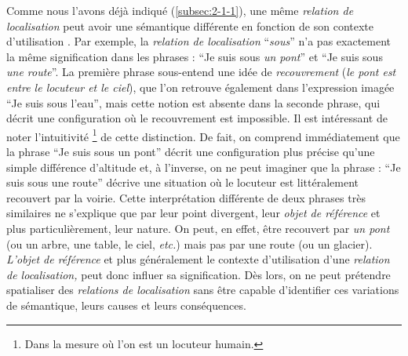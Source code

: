 Comme nous l'avons déjà indiqué (\autoref{subsec:2-1-1}), une même
\emph{relation de localisation} peut avoir une sémantique différente
en fonction de son contexte d'utilisation
\autocite[16]{Borillo1998}. Par exemple, la \emph{relation de
  localisation} \enquote{\emph{sous}} n'a pas exactement la même
signification dans les phrases : \enquote{Je suis sous \emph{un pont}}
et \enquote{Je suis sous \emph{une route}}. La première phrase
sous-entend une idée de \emph{recouvrement} (\ie \emph{le pont est
  entre le locuteur et le ciel}), que l'on retrouve également dans
l'expression imagée \enquote{Je suis sous l'eau}, mais cette notion
est absente dans la seconde phrase, qui décrit une configuration où le
recouvrement est impossible. Il est intéressant de noter l'intuitivité
\footnote{Dans la mesure où l'on est un locuteur humain.} de cette
distinction. De fait, on comprend immédiatement que la phrase
\enquote{Je suis sous un pont} décrit une configuration plus précise
qu'une simple différence d'altitude et, à l'inverse, on ne peut
imaginer que la phrase : \enquote{Je suis sous une route} décrive une
situation où le locuteur est littéralement recouvert par la
voirie. Cette interprétation différente de deux phrases très
similaires ne s'explique que par leur point divergent, leur
\emph{objet de référence} et plus particulièrement, leur nature. On
peut, en effet, être recouvert par \emph{un pont} (ou un arbre, une
table, le ciel, \emph{etc.}) mais pas par une route (ou un
glacier). \emph{L'objet de référence} et plus généralement le contexte
d'utilisation d'une \emph{relation de localisation,} peut donc influer
sa signification. Dès lors, on ne peut prétendre spatialiser des
\emph{relations de localisation} sans être capable d'identifier ces
variations de sémantique, leurs causes et leurs conséquences.

